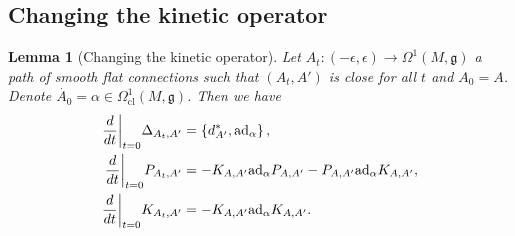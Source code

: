 \documentclass[11pt,a4paper]{amsart}
\theoremstyle{plain} %
\newtheorem{lem}[thm]{Lemma}
\theoremstyle{definition}
\theoremstyle{remark}
\newcommand{\g}{\mathfrak{g}}
\newcommand{\dd}{d}
\newcommand{\mr}{\mathrm}
\newcommand\restr[2]{{%
  \left.\kern-\nulldelimiterspace %
  #1 %
  \vphantom{\big|} %
  \right|_{#2} %
  }}
\begin{document}
\subsection{Changing the kinetic operator} 

\begin{lem}[Changing the kinetic operator] \label{lem:varAt} %
Let $A_t\colon (-\epsilon,\epsilon) \to \Omega^1(M,\g)$ a path of smooth flat connections such that $(A_t,A')$ is close for all $t$ and $A_0 = A$. Denote $\dot{A_0} = \alpha \in \Omega^1_\mr{cl}(M,\g)$. 
Then we have
\begin{align}
\restr{\frac{d}{dt}}{t=0}\Delta_{A_t,A'} &= \left\lbrace \dd^*_{A'},\mathrm{ad}_\alpha\right\rbrace , \label{eq:varLaplacekin} \\
\restr{\frac{d}{dt}}{t=0} P_{A_t,A'} &= -  K_{A,A'} \mathrm{ad}_\alpha  P_{A,A'} - P_{A,A'}  \mathrm{ad}_\alpha    K_{A,A'}, \label{eq:varPharmkin} \\
\restr{\frac{d}{dt}}{t=0}{K}_{A_t,A'} &= - K_{A,A'}\mathrm{ad}_\alpha K_{A,A'}.  \label{eq:varKkin}
\end{align}
\end{lem}
\end{document}
